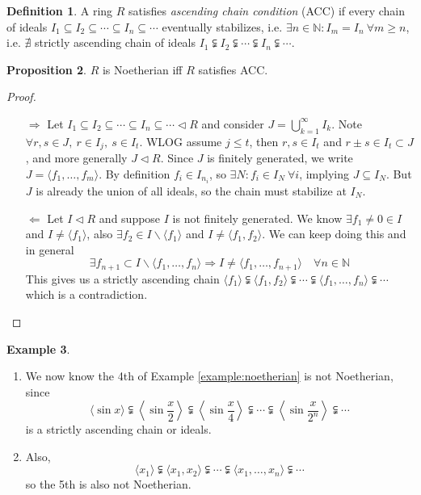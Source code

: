\documentclass[a4paper]{article}
\theoremstyle{definition}
\newtheorem{defn}{Definition}[subsection]
\newtheorem{prop}[defn]{Proposition}
\newtheorem{example}[defn]{Example}
\begin{document}
\begin{defn}
A ring $R$ satisfies \textit{ascending chain condition} (ACC) if every chain of ideals $I_1\subseteq I_2\subseteq \cdots \subseteq I_n\subseteq \cdots$ eventually stabilizes, i.e. $\exists n\in\mathbb N:I_m=I_n \ \forall m\geq n$, i.e. $\nexists$ strictly ascending chain of ideals $I_1\subsetneqq I_2\subsetneqq \cdots \subsetneqq I_n \subsetneqq \cdots$.
\end{defn}
\begin{prop}
$R$ is Noetherian iff $R$ satisfies ACC.
\end{prop}
\begin{proof}
\begin{itemize}
\item[$\Rightarrow$] Let $I_1\subseteq I_2\subseteq \cdots \subseteq I_n\subseteq \cdots \lhd R$ and consider $J=\bigcup_{k=1}^\infty I_k$. Note $\forall r,s\in J,\ r\in I_j,\ s\in I_t$. WLOG assume $j\leq t$, then $r,s\in I_t$ and $r\pm s\in I_t\subset J$, and more generally $J\lhd R$. Since $J$ is finitely generated, we write $J=\langle f_1,\ldots,f_m\rangle$. By definition $f_i\in I_{n_i}$, so $\exists N:f_i\in I_N \ \forall i$, implying $J\subseteq I_N$. But $J$ is already the union of all ideals, so the chain must stabilize at $I_N$.

\item[$\Leftarrow$] Let $I\lhd R$ and suppose $I$ is not finitely generated. We know $\exists f_1\neq 0\in I$ and $I\neq \langle f_1\rangle$, also $\exists f_2\in I\backslash \langle f_1\rangle$ and $I\neq \langle f_1,f_2\rangle$. We can keep doing this and in general
\[
\exists f_{n+1}\subset I\backslash \langle f_1,\ldots,f_n\rangle \Rightarrow I\neq \langle f_1,\ldots,f_{n+1}\rangle \quad \forall n\in \mathbb N
\]
This gives us a strictly ascending chain $\langle f_1\rangle \subsetneqq \langle f_1,f_2\rangle \subsetneqq \cdots \subsetneqq \langle f_1,\ldots,f_n\rangle \subsetneqq \cdots$ which is a contradiction.
\end{itemize}
\end{proof}
\begin{example}
\begin{enumerate}
\item We now know the 4th of Example \ref{example:noetherian} is not Noetherian, since
\[
\langle \sin x\rangle \subsetneqq \left\langle \sin \frac{x}{2}\right\rangle \subsetneqq \left\langle \sin \frac{x}{4}\right\rangle \subsetneqq \cdots \subsetneqq \left\langle \sin \frac{x}{2^n}\right\rangle \subsetneqq \cdots
\]
is a strictly ascending chain or ideals.
\item Also,
\[
\langle x_1\rangle \subsetneqq \langle x_1,x_2\rangle \subsetneqq \cdots\subsetneqq \langle x_1,\ldots,x_n\rangle \subsetneqq \cdots
\]
so the 5th is also not Noetherian.
\end{enumerate}
\end{example}
\end{document}
